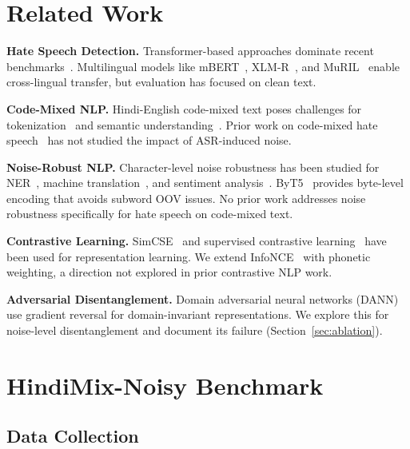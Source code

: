 \documentclass[conference]{IEEEtran}
\begin{document}
\section{Related Work}

\textbf{Hate Speech Detection.} Transformer-based approaches dominate recent benchmarks~\cite{mozafari2020bert, caselli2020hatebert}. Multilingual models like mBERT~\cite{devlin2019bert}, XLM-R~\cite{conneau2020xlmr}, and MuRIL~\cite{khanuja2021muril} enable cross-lingual transfer, but evaluation has focused on clean text.

\textbf{Code-Mixed NLP.} Hindi-English code-mixed text poses challenges for tokenization~\cite{pratapa2018language} and semantic understanding~\cite{khanuja2020gluecos}. Prior work on code-mixed hate speech~\cite{bohra2018dataset, mandl2021hasoc} has not studied the impact of ASR-induced noise.

\textbf{Noise-Robust NLP.} Character-level noise robustness has been studied for NER~\cite{piktus2019misspelling}, machine translation~\cite{belinkov2018synthetic}, and sentiment analysis~\cite{eger2019text}. ByT5~\cite{xue2022byt5} provides byte-level encoding that avoids subword OOV issues. No prior work addresses noise robustness specifically for hate speech on code-mixed text.

\textbf{Contrastive Learning.} SimCSE~\cite{gao2021simcse} and supervised contrastive learning~\cite{khosla2020supervised} have been used for representation learning. We extend InfoNCE~\cite{oord2018representation} with phonetic weighting, a direction not explored in prior contrastive NLP work.

\textbf{Adversarial Disentanglement.} Domain adversarial neural networks (DANN)~\cite{ganin2016domain} use gradient reversal for domain-invariant representations. We explore this for noise-level disentanglement and document its failure (Section~\ref{sec:ablation}).


\section{HindiMix-Noisy Benchmark}
\label{sec:benchmark}

\subsection{Data Collection}
\end{document}
